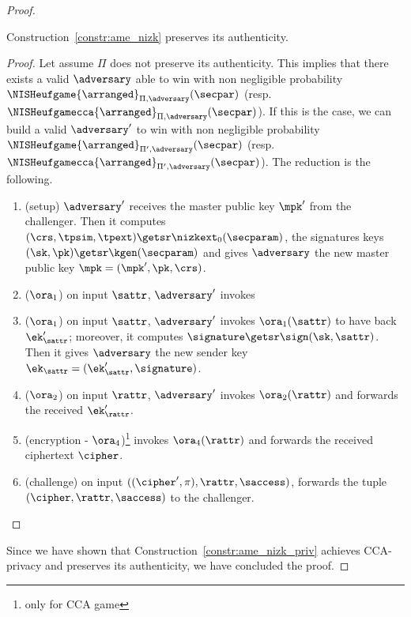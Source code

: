 \begin{proof}
    \begin{lemma}\label{lemma:ame_auth_same}
        Construction~\ref{constr:ame_nizk} preserves its authenticity.
        \begin{proof}
            Let assume $\Pi$ does not preserve its authenticity. This implies that there exists a valid $\adversary$ able to win with non negligible probability $\NISHeufgame{\arranged}_{\Pi, \adversary}(\secpar)$ (resp. $\NISHeufgamecca{\arranged}_{\Pi, \adversary}(\secpar)$). If this is the case, we can build a valid $\adversary'$ to win with non negligible probability $\NISHeufgame{\arranged}_{\Pi', \adversary}(\secpar)$ (resp. $\NISHeufgamecca{\arranged}_{\Pi', \adversary}(\secpar)$). The reduction is the following.

            \begin{enumerate}
                \item (setup) $\adversary'$ receives the master public key $\mpk'$ from the challenger. Then it computes $(\crs,\tpsim,\tpext)\getsr\nizkext_0(\secparam)$, the signatures keys $(\sk, \pk) \getsr \kgen(\secparam)$ and gives $\adversary$ the new master public key $\mpk = (\mpk', \pk, \crs)$.
                \item ($\ora_1$) on input $\sattr$, $\adversary'$ invokes \item ($\ora_1$) on input $\sattr$, $\adversary'$ invokes $\ora_1(\sattr)$ to have back $\ek'_\sattr$; moreover, it computes $\signature \getsr \sign(\sk, \sattr)$. Then it gives $\adversary$ the new sender key $\ek_\sattr = (\ek'_\sattr, \signature)$.
                \item ($\ora_2$) on input $\rattr$, $\adversary'$ invokes $\ora_2(\rattr)$ and forwards the received $\ek'_\rattr$.
                \item (encryption - $\ora_4$)\footnote{only for CCA game} invokes $\ora_4(\rattr)$ and forwards the received ciphertext $\cipher$.
                \item (challenge) on input $((\cipher', \pi), \rattr, \saccess)$, forwards the tuple $(\cipher, \rattr, \saccess)$ to the challenger.
            \end{enumerate}
        \end{proof}
    \end{lemma}
    Since we have shown that Construction~\ref{constr:ame_nizk_priv} achieves CCA-privacy and preserves its authenticity, we have concluded the proof.
\end{proof}
